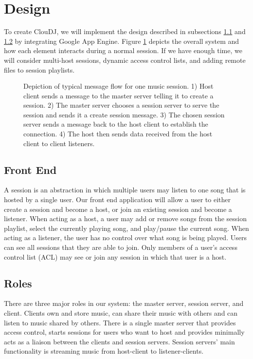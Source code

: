 \section{Design}
\label{sec:design}
To create ClouDJ, we will implement the design described 
in subsections \ref{sec:frontend} and \ref{sec:roles} 
by integrating Google App Engine. 
Figure \ref{fig:arch} depicts the overall system and how each element 
interacts during a normal session. If we have enough time, 
we will consider multi-host sessions, dynamic access 
control lists, and adding remote files to session playlists.

\begin{figure}[h]
\caption{Depiction of typical message flow for one music session. 
1) Host client sends a message to the master server telling it to create a session. 
2) The master server chooses a session server to serve the session and 
sends it a create session message. 
3) The chosen session server sends a message back to the 
host client to establish the connection. 
4) The host then sends data received from the host client to client listeners.
}
\label{fig:arch}
\end{figure}

\subsection{Front End}
\label{sec:frontend}
A session is an abstraction in which multiple users 
may listen to one song that is hosted by a single user. 
Our front end application will allow a user to either 
create a session and become a host, or join an existing 
session and become a listener. When acting as a host, 
a user may add or remove songs from the session playlist, 
select the currently playing song, and play/pause the 
current song. When acting as a listener, the user has 
no control over what song is being played. Users can 
see all sessions that they are able to join. Only 
members of a user's access control list (ACL) may 
see or join any session in which that user is a host.

\subsection{Roles}
\label{sec:roles}
There are three major roles in our system: 
the master server, session server, and client. Clients own 
and store music, can share their music with others 
and can listen to music shared by others. There is a 
single master server that provides access control, 
starts sessions for users who want to host and provides 
minimally acts as a liaison between the clients and 
session servers. Session servers' main functionality 
is streaming music from host-client to listener-clients.

